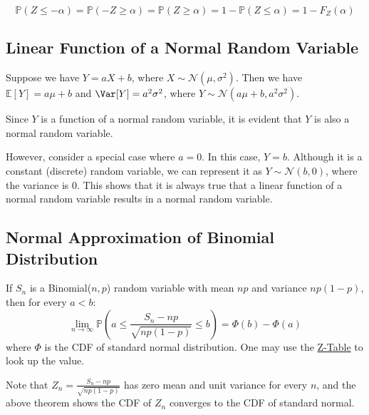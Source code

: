 \begin{remark}
    \[
    \mathbb{P}(Z \leq -\alpha) = \mathbb{P}(-Z \geq \alpha) = \mathbb{P}(Z \geq \alpha) = 1 - \mathbb{P}(Z \leq \alpha) = 1 - F_Z(\alpha)
\]
\end{remark}

\subsection{Linear Function of a Normal Random Variable}
Suppose we have \(Y = aX + b\), where \(X \sim \mathcal{N}(\mu, \sigma^2)\). Then we have \(\mathbb{E}[Y] = a\mu + b\) and \(\Var[Y] = a^2\sigma^2\), where \(Y \sim \mathcal{N}(a\mu + b, a^2\sigma^2)\). 

Since \(Y\) is a function of a normal random variable, it is evident that \(Y\) is also a normal random variable.

However, consider a special case where \(a = 0\). In this case, \(Y = b\). Although it is a constant (discrete) random variable, we can represent it as \(Y \sim \mathcal{N}(b, 0)\), where the variance is 0. This shows that it is always true that a linear function of a normal random variable results in a normal random variable.

\subsection{Normal Approximation of Binomial Distribution}
\begin{theorem}
    If \(S_n\) is a Binomial(\(n, p\)) random variable with mean \(np\) and variance \(np(1 - p)\), then for every \(a < b\): 
    \[
        \lim_{n \to \infty} \mathbb{P}\left(a \leq  \dfrac{S_n - np}{\sqrt{np(1 - p)}} \leq  b\right) = \varPhi (b) - \varPhi (a)
    \]
    where \(\varPhi\) is the CDF of standard normal distribution. One may use the \href{page=51}{Z-Table} to look up the value. 
    \begin{remark}
        Note that \(Z_n = \frac{S_n - np}{\sqrt{np(1 - p)}}\) has zero mean and unit variance for every \(n\), and the above theorem shows the CDF of \(Z_n\) converges to the CDF of standard normal. 
    \end{remark}
\end{theorem}

